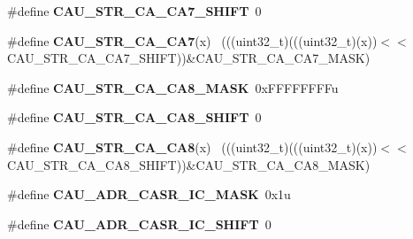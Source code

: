 \begin{DoxyCompactItemize}
\item 
\hypertarget{group___c_a_u___register___masks_ga438fb9b2bcfb9ce4ff046f9cf3fb12e2}{}\#define {\bfseries C\+A\+U\+\_\+\+S\+T\+R\+\_\+\+C\+A\+\_\+\+C\+A7\+\_\+\+S\+H\+I\+F\+T}~0\label{group___c_a_u___register___masks_ga438fb9b2bcfb9ce4ff046f9cf3fb12e2}

\item 
\hypertarget{group___c_a_u___register___masks_gac37497ce756fc2908fc063ced29986a6}{}\#define {\bfseries C\+A\+U\+\_\+\+S\+T\+R\+\_\+\+C\+A\+\_\+\+C\+A7}(x)                                            ~(((uint32\+\_\+t)(((uint32\+\_\+t)(x))$<$$<$C\+A\+U\+\_\+\+S\+T\+R\+\_\+\+C\+A\+\_\+\+C\+A7\+\_\+\+S\+H\+I\+F\+T))\&C\+A\+U\+\_\+\+S\+T\+R\+\_\+\+C\+A\+\_\+\+C\+A7\+\_\+\+M\+A\+S\+K)\label{group___c_a_u___register___masks_gac37497ce756fc2908fc063ced29986a6}

\item 
\hypertarget{group___c_a_u___register___masks_ga841925012949d7e6ee56bffe7c3ccc34}{}\#define {\bfseries C\+A\+U\+\_\+\+S\+T\+R\+\_\+\+C\+A\+\_\+\+C\+A8\+\_\+\+M\+A\+S\+K}~0x\+F\+F\+F\+F\+F\+F\+F\+Fu\label{group___c_a_u___register___masks_ga841925012949d7e6ee56bffe7c3ccc34}

\item 
\hypertarget{group___c_a_u___register___masks_ga7ca88815b2d128a4164b3e14953ed7f2}{}\#define {\bfseries C\+A\+U\+\_\+\+S\+T\+R\+\_\+\+C\+A\+\_\+\+C\+A8\+\_\+\+S\+H\+I\+F\+T}~0\label{group___c_a_u___register___masks_ga7ca88815b2d128a4164b3e14953ed7f2}

\item 
\hypertarget{group___c_a_u___register___masks_gad5659d8ff3bd4389d766a5a2f28ac820}{}\#define {\bfseries C\+A\+U\+\_\+\+S\+T\+R\+\_\+\+C\+A\+\_\+\+C\+A8}(x)                                            ~(((uint32\+\_\+t)(((uint32\+\_\+t)(x))$<$$<$C\+A\+U\+\_\+\+S\+T\+R\+\_\+\+C\+A\+\_\+\+C\+A8\+\_\+\+S\+H\+I\+F\+T))\&C\+A\+U\+\_\+\+S\+T\+R\+\_\+\+C\+A\+\_\+\+C\+A8\+\_\+\+M\+A\+S\+K)\label{group___c_a_u___register___masks_gad5659d8ff3bd4389d766a5a2f28ac820}

\item 
\hypertarget{group___c_a_u___register___masks_ga5c604aca577b3d7a07e03e6b98ae418f}{}\#define {\bfseries C\+A\+U\+\_\+\+A\+D\+R\+\_\+\+C\+A\+S\+R\+\_\+\+I\+C\+\_\+\+M\+A\+S\+K}~0x1u\label{group___c_a_u___register___masks_ga5c604aca577b3d7a07e03e6b98ae418f}

\item 
\hypertarget{group___c_a_u___register___masks_ga0659a788cbcc596dc60f7d85104ade27}{}\#define {\bfseries C\+A\+U\+\_\+\+A\+D\+R\+\_\+\+C\+A\+S\+R\+\_\+\+I\+C\+\_\+\+S\+H\+I\+F\+T}~0\label{group___c_a_u___register___masks_ga0659a788cbcc596dc60f7d85104ade27}


\end{DoxyCompactItemize}
